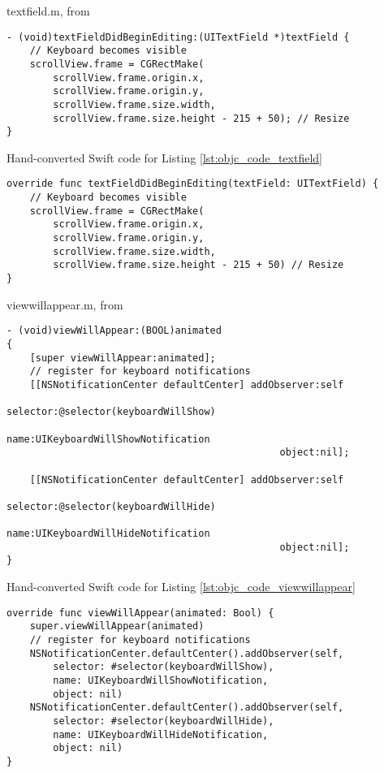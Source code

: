 \documentclass{sfuthesis}
\begin{document}
\begin{appendices}
\begin{listing}
\caption{textfield.m, from \cite{so1126726}}
\label{lst:objc_code_textfield}
\begin{verbatim}
- (void)textFieldDidBeginEditing:(UITextField *)textField { 
    // Keyboard becomes visible
    scrollView.frame = CGRectMake(
        scrollView.frame.origin.x, 
        scrollView.frame.origin.y, 
        scrollView.frame.size.width,
        scrollView.frame.size.height - 215 + 50); // Resize
}
\end{verbatim}
\end{listing}

\begin{listing}
\caption{Hand-converted Swift code for Listing \ref{lst:objc_code_textfield}}
\begin{verbatim}
override func textFieldDidBeginEditing(textField: UITextField) {
    // Keyboard becomes visible
    scrollView.frame = CGRectMake(
        scrollView.frame.origin.x,
        scrollView.frame.origin.y,
        scrollView.frame.size.width,
        scrollView.frame.size.height - 215 + 50) // Resize
}
\end{verbatim}
\end{listing}

\begin{listing}
\caption{viewwillappear.m, from \cite{so1126726}}
\label{lst:objc_code_viewwillappear}
\begin{verbatim}
- (void)viewWillAppear:(BOOL)animated
{
    [super viewWillAppear:animated];
    // register for keyboard notifications
    [[NSNotificationCenter defaultCenter] addObserver:self
                                             selector:@selector(keyboardWillShow)
                                                 name:UIKeyboardWillShowNotification
                                               object:nil];

    [[NSNotificationCenter defaultCenter] addObserver:self
                                             selector:@selector(keyboardWillHide)
                                                 name:UIKeyboardWillHideNotification
                                               object:nil];
}
\end{verbatim}
\end{listing}

\begin{listing}
\caption{Hand-converted Swift code for Listing \ref{lst:objc_code_viewwillappear}}
\begin{verbatim}
override func viewWillAppear(animated: Bool) {
    super.viewWillAppear(animated)
    // register for keyboard notifications
    NSNotificationCenter.defaultCenter().addObserver(self,
        selector: #selector(keyboardWillShow),
        name: UIKeyboardWillShowNotification,
        object: nil)
    NSNotificationCenter.defaultCenter().addObserver(self,
        selector: #selector(keyboardWillHide),
        name: UIKeyboardWillHideNotification,
        object: nil)
}
\end{verbatim}
\end{listing}
	
\end{appendices}
\end{document}
